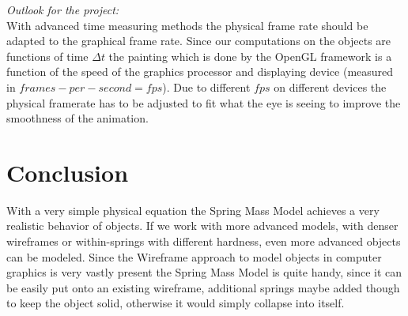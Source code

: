 \documentclass[11pt]{article}
\begin{document}
\textit{Outlook for the project:}\\
With advanced time measuring methods the physical frame rate should be adapted to the graphical frame rate. Since our computations on the objects are functions of time $\Delta t$ the painting which is done by the OpenGL framework is a function of the speed of the graphics processor and displaying device (measured in $frames-per-second=fps$). Due to different $fps$ on different devices the physical framerate has to be adjusted to fit what the eye is seeing to improve the smoothness of the animation.\\[1em]
%

\section{Conclusion}
With a very simple physical equation the Spring Mass Model achieves a very realistic behavior of objects. If we work with more advanced models, with denser wireframes or within-springs with different hardness, even more advanced objects can be modeled. Since the Wireframe approach to model objects in computer graphics is very vastly present the Spring Mass Model is quite handy, since it can be easily put onto an existing wireframe, additional springs maybe added though to keep the object solid, otherwise it would simply collapse into itself.
%


%
%
\newpage
\nocite{hill}
\nocite{rogersadams}
\nocite{dam}
\nocite{PBDM}
\nocite{baker}
\nocite{bakerGL}
\nocite{IASDO}
\nocite{LSCS}
\nocite{DCMSM}
\nocite{gama}
\nocite{wiki}
\nocite{hair}
\nocite{pyGL}



%
%
\end{document}
